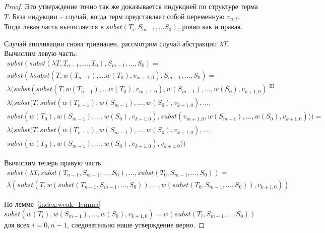 \begin{proof}
  Это утверждение точно так же доказывается индукцией по структуре терма $T$. База индукции -- случай, когда терм представляет собой переменную $v_{n, i}$. Тогда левая часть вычисляется в $subst(T_{i}, S_{m-1}, \dots S_{0})$, ровно как и правая.

  Случай аппликации снова тривиален, рассмотрим случай абстракции $\lambda T$. Вычислим левую часть:
  \begin{gather*}
    subst(subst(\lambda T, T_{n-1}, \dots, T_{0}), S_{m-1}, \dots, S_{0}) = \\
    subst(\lambda subst( T, w(T_{n - 1}), \dots w(T_{0}), v_{m+1, 0} ), S_{m - 1}, \dots, S_{0}) = \\
    \lambda(subst(subst( T, w(T_{n - 1}), \dots w(T_{0}), v_{m+1, 0} ), w(S_{m-1}), \dots, w(S_{0}), v_{k+1, 0}) \overset{\mathrm{IH}}{=} \\
    \lambda(subst(T, subst(w(T_{n-1}), w(S_{m-1}), \dots, w(S_{0}), v_{k+1, 0}), \dots, \\
    subst(w(T_{0}), w(S_{m-1}), \dots, w(S_{0}), v_{k+1, 0}), subst(v_{m+1, 0}, w(S_{m-1}), \dots, w(S_{0}), v_{k+1, 0}))) = \\
    \lambda(subst(T, subst(w(T_{n-1}), w(S_{m-1}), \dots, w(S_{0}), v_{k+1, 0}), \dots, \\
    subst(w(T_{0}), w(S_{m-1}), \dots, w(S_{0}), v_{k+1, 0}), v_{k+1, 0}))
  \end{gather*}

  Вычислим теперь правую часть:
  \begin{gather*}
    subst(\lambda T, subst(T_{n-1}, S_{m - 1}, \dots, S_{0}), \dots, subst(T_{0}, S_{m - 1}, \dots, S_{0})) = \\
    \lambda(subst(T, w(subst(T_{n-1}, S_{m - 1}, \dots, S_{0})), \dots, w(subst(T_{0}, S_{m - 1}, \dots, S_{0})), v_{k+1, 0}))
  \end{gather*}

  По лемме~\ref{index:weak_lemma} $subst(w(T_{i}), w(S_{m-1}), \dots, w(S_{0}), v_{k+1, 0}) = w(subst(T_{i}, S_{m - 1}, \dots, S_{0}))$ для всех $i=\overline{0, n-1}$, следовательно наше утверждение верно.
\end{proof}
